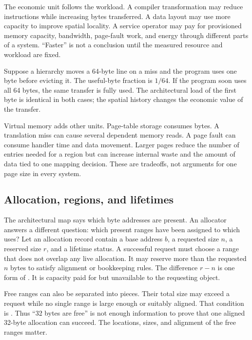 The economic unit follows the workload. A compiler transformation may reduce
instructions while increasing bytes transferred. A data layout may use more
capacity to improve spatial locality. A service operator may pay for
provisioned memory capacity, bandwidth, page-fault work, and energy through
different parts of a system. ``Faster'' is not a conclusion until the measured
resource and workload are fixed.

\begin{example}[title={One useful byte can cause a larger transfer}]
Suppose a hierarchy moves a 64-byte line on a miss and the program uses one
byte before evicting it. The useful-byte fraction is \(1/64\). If the program
soon uses all 64 bytes, the same transfer is fully used. The architectural
load of the first byte is identical in both cases; the spatial history changes
the economic value of the transfer.
\end{example}

Virtual memory adds other units. Page-table storage consumes bytes. A
translation miss can cause several dependent memory reads. A page fault can
consume handler time and data movement. Larger pages reduce the number of
entries needed for a region but can increase internal waste and the amount of
data tied to one mapping decision. These are tradeoffs, not arguments for one
page size in every system.

\subsection{Allocation, regions, and lifetimes}

The architectural map says which byte addresses are present. An allocator
answers a different question: which present ranges have been assigned to
which uses? Let an allocation record contain a base address \(b\), a requested
size \(n\), a reserved size \(r\), and a lifetime status. A successful request
must choose a range that does not overlap any live allocation. It may reserve
more than the requested \(n\) bytes to satisfy alignment or bookkeeping
rules. The difference \(r-n\) is one form of .
It is capacity paid for but unavailable to the requesting object.

Free ranges can also be separated into pieces. Their total size may exceed a
request while no single range is large enough or suitably aligned. That
condition is . Thus ``32 bytes are free'' is
not enough information to prove that one aligned 32-byte allocation can
succeed. The locations, sizes, and alignment of the free ranges matter.


